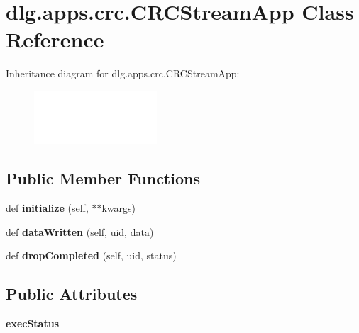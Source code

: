 \hypertarget{classdlg_1_1apps_1_1crc_1_1_c_r_c_stream_app}{}\section{dlg.\+apps.\+crc.\+C\+R\+C\+Stream\+App Class Reference}
\label{classdlg_1_1apps_1_1crc_1_1_c_r_c_stream_app}
Inheritance diagram for dlg.\+apps.\+crc.\+C\+R\+C\+Stream\+App\+:\begin{figure}[H]
\begin{center}
\leavevmode
\includegraphics[height=2.000000cm]{classdlg_1_1apps_1_1crc_1_1_c_r_c_stream_app}
\end{center}
\end{figure}
\subsection*{Public Member Functions}
\begin{DoxyCompactItemize}
\item 
\mbox{\label{classdlg_1_1apps_1_1crc_1_1_c_r_c_stream_app_a0d65156722536b704436b1bd3af2bdb7}} 
def {\bfseries initialize} (self, $\ast$$\ast$kwargs)
\item 
\mbox{\label{classdlg_1_1apps_1_1crc_1_1_c_r_c_stream_app_add98f293abf9a9cab6f2381d7d51ffdf}} 
def {\bfseries data\+Written} (self, uid, data)
\item 
\mbox{\label{classdlg_1_1apps_1_1crc_1_1_c_r_c_stream_app_a95dc1b0d119e5549ff9085236f7135d7}} 
def {\bfseries drop\+Completed} (self, uid, status)
\end{DoxyCompactItemize}
\subsection*{Public Attributes}
\begin{DoxyCompactItemize}
\item 
\mbox{\label{classdlg_1_1apps_1_1crc_1_1_c_r_c_stream_app_a6fcefee4d6a1ddbd89b692ccf1a35e04}} 
{\bfseries exec\+Status}
\end{DoxyCompactItemize}
